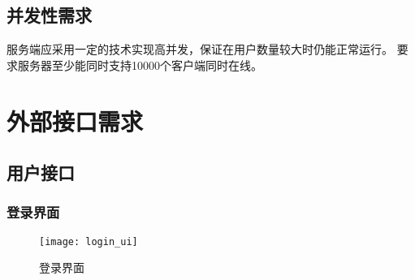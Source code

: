 \subsection{并发性需求}

服务端应采用一定的技术实现高并发，保证在用户数量较大时仍能正常运行。
要求服务器至少能同时支持10000个客户端同时在线。

\section{外部接口需求}
\subsection{用户接口}
% 
% 
% 
% 
% 


\subsubsection{登录界面}

\begin{figure}[h]
	\centering
	\texttt{[image: login\_ui]}
	\caption{登录界面} \label{fig:login_ui}
\end{figure}


